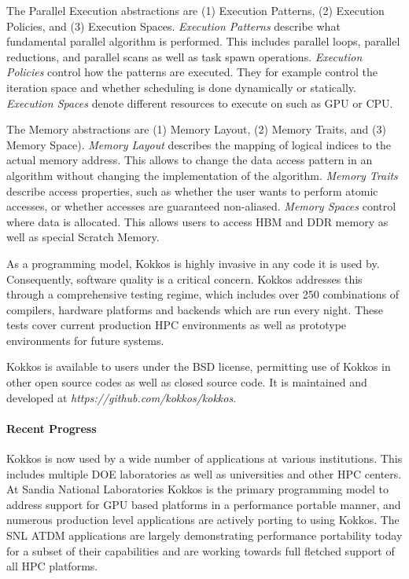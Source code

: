 The Parallel Execution abstractions are (1) Execution Patterns, (2) Execution Policies, and (3) Execution Spaces. 
{\it Execution Patterns} describe what fundamental parallel algorithm is performed. This includes parallel loops, parallel reductions, and parallel scans as well as task spawn operations. 
{\it Execution Policies} control how the patterns are executed. They for example control the iteration space and whether scheduling is done dynamically or statically.
{\it Execution Spaces} denote different resources to execute on such as GPU or CPU. 

The Memory abstractions are (1) Memory Layout, (2) Memory Traits, and (3) Memory Space). 
{\it Memory Layout} describes the mapping of logical indices to the actual memory address. 
This allows to change the data access pattern in an algorithm without changing the implementation of the algorithm.
{\it Memory Traits} describe access properties, such as whether the user wants to perform atomic accesses, or whether accesses are guaranteed non-aliased. 
{\it Memory Spaces} control where data is allocated. This allows users to access HBM and DDR memory as well as special Scratch Memory. 


As a programming model, Kokkos is highly invasive in any code it is used by. 
Consequently, software quality is a critical concern.
Kokkos addresses this through a comprehensive testing regime, which includes over 250 combinations of compilers, hardware platforms and backends which are run every night. 
These tests cover current production HPC environments as well as prototype environments for future systems. 

Kokkos is available to users under the BSD license, permitting use of Kokkos in other open source codes as well as closed source code. 
It is maintained and developed at {\it https://github.com/kokkos/kokkos}. 

\paragraph{Recent Progress}

Kokkos is now used by a wide number of applications at various institutions. 
This includes multiple DOE laboratories as well as universities and other HPC centers.
At Sandia National Laboratories Kokkos is the primary programming model to address support for GPU based platforms in a performance portable manner, and numerous production level applications are actively porting to using Kokkos. 
The SNL ATDM applications are largely demonstrating performance portability today for a subset of their capabilities and are working towards full fletched support of all HPC platforms. 

